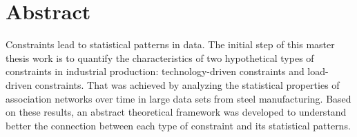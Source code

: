 \chapter*{Abstract}
	
Constraints lead to statistical patterns in data. The initial step of this master thesis work is to quantify the characteristics of two hypothetical types of constraints in industrial production: technology-driven constraints and load-driven constraints. That was achieved by analyzing the statistical properties of association networks over time in large data sets from steel manufacturing. Based on these results, an abstract theoretical framework was developed to understand better the connection between each type of constraint and its statistical patterns.